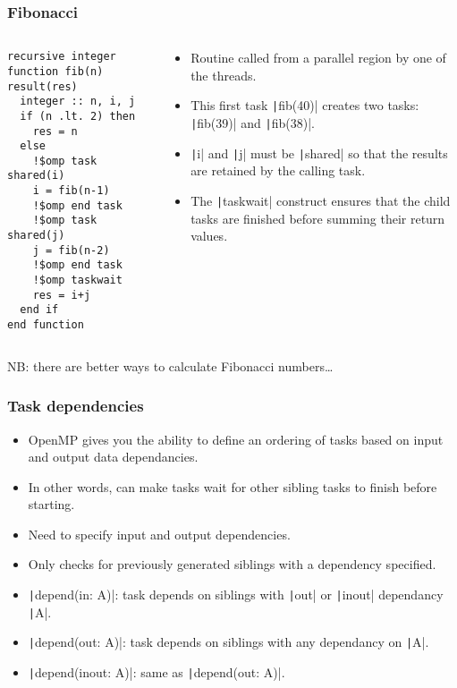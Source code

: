 \documentclass{beamer}
\begin{document}
\begin{frame}[fragile]
\frametitle{Fibonacci}
\begin{columns}
\begin{column}{0.5\textwidth}
\begin{verbatim}
recursive integer function fib(n) result(res)
  integer :: n, i, j
  if (n .lt. 2) then
    res = n
  else
    !$omp task shared(i)
    i = fib(n-1)
    !$omp end task
    !$omp task shared(j)
    j = fib(n-2)
    !$omp end task
    !$omp taskwait
    res = i+j
  end if
end function
\end{verbatim}
\end{column}

\begin{column}{0.5\textwidth}
\begin{itemize}
  \item Routine called from a parallel region by one of the threads.
  \item This first task \texttt|fib(40)| creates two tasks: \texttt|fib(39)| and \texttt|fib(38)|.
  \item \texttt|i| and \texttt|j| must be \texttt|shared| so that the results are retained by the calling task.
  \item The \texttt|taskwait| construct ensures that the child tasks are finished before summing their return values.
\end{itemize}
\end{column}

\end{columns}
NB: there are better ways to calculate Fibonacci numbers\dots
\end{frame}

\begin{frame}
\frametitle{Task dependencies}
\begin{itemize}
  \item OpenMP gives you the ability to define an ordering of tasks based on input and output data dependancies.
  \item In other words, can make tasks wait for other sibling tasks to finish before starting.
  \item Need to specify input and output dependencies.
  \item Only checks for previously generated siblings with a dependency specified.
  \item \texttt|depend(in: A)|: task depends on siblings with \texttt|out| or \texttt|inout| dependancy \texttt|A|.
  \item \texttt|depend(out: A)|: task depends on siblings with any dependancy on \texttt|A|.
  \item \texttt|depend(inout: A)|: same as \texttt|depend(out: A)|.
\end{itemize}
\end{frame}
\end{document}

